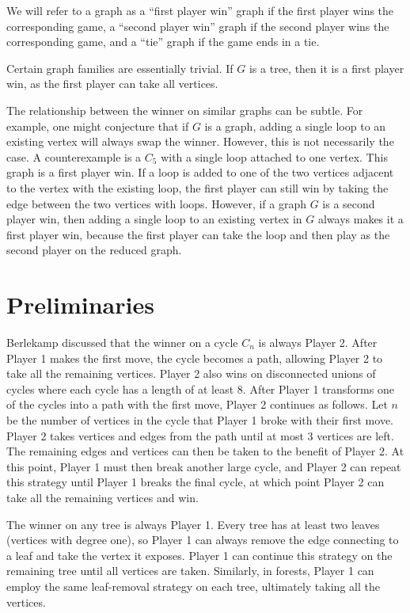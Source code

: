 \documentclass{article}
\begin{document}
We will refer to a graph as a ``first player win'' graph if the first player wins the corresponding game, a ``second player win'' graph if the second player wins the corresponding game, and a ``tie'' graph if the game ends in a tie.

Certain graph families are essentially trivial. If $G$ is a tree, then it is a first player win, as the first player can take all vertices. 

The relationship between the winner on similar graphs can be subtle. For example, one might conjecture that if $G$ is a graph, adding a single loop to an existing vertex will always swap the winner. However, this is not necessarily the case. A counterexample is a $C_5$ with a single loop attached to one vertex. This graph is a first player win. If a loop is added to one of the two vertices adjacent to the vertex with the existing loop, the first player can still win by taking the edge between the two vertices with loops. However, if a graph $G$ is a second player win, then adding a single loop to an existing vertex in $G$ always makes it a first player win, because the first player can take the loop and then play as the second player on the reduced graph.


\section{Preliminaries}
Berlekamp discussed that the winner on a cycle $C_n$ is always Player 2. After Player 1 makes the first move, the cycle becomes a path, allowing Player 2 to take all the remaining vertices. Player 2 also wins on disconnected unions of cycles where each cycle has a length of at least 8. After Player 1 transforms one of the cycles into a path with the first move, Player 2 continues as follows. Let $n$ be the number of vertices in the cycle that Player 1 broke with their first move. Player 2 takes vertices and edges from the path until at most 3 vertices are left. The remaining edges and vertices can then be taken to the benefit of Player 2. At this point, Player 1 must then break another large cycle, and Player 2 can repeat this strategy until Player 1 breaks the final cycle, at which point Player 2 can take all the remaining vertices and win.

The winner on any tree is always Player 1. Every tree has at least two leaves (vertices with degree one), so Player 1 can always remove the edge connecting to a leaf and take the vertex it exposes. Player 1 can continue this strategy on the remaining tree until all vertices are taken. Similarly, in forests, Player 1 can employ the same leaf-removal strategy on each tree, ultimately taking all the vertices.
\end{document}
